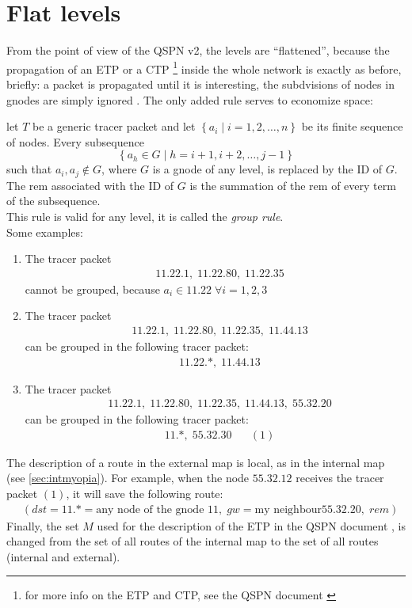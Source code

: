 \documentclass[a4paper]{article}
\newcommand{\T}[1]{\textrm{#1}}
\newcommand{\pgra}[1]{\left\{#1\right\}}
\newcommand{\eal}[1]{{\begin{align*} #1 \end{align*}}}
\def\'{{\;\;\;}}
\begin{document}
\section{Flat levels}
\label{sec:flat}
From the point of view of the QSPN v2, the levels are ``flattened'', because
the propagation of an ETP or a CTP \footnote{for more info on the ETP and CTP,
see the QSPN document \cite{qspndoc}} inside the whole network is exactly as
before, briefly: a packet is propagated until it is interesting, the
subdvisions of nodes in gnodes are simply ignored . The only
added rule serves to economize space: 

let $T$ be a generic tracer packet and let $\pgra{a_i\;|\;i=1,2,\dots,n}$ be its finite sequence of nodes.
Every subsequence \[\pgra{a_h\in G\;|\;h=i+1,i+2,\dots,j-1}\]
such that $a_i,a_j\notin G$, where $G$ is a gnode of any level, is replaced by
the ID of $G$. The rem associated with the ID of $G$ is the summation of the
rem of every term of the subsequence.\\
This rule is valid for any level, it is called the \emph{group rule}.\\
Some examples:
\begin{enumerate}
	\item The tracer packet
		\eal{&11.22.1,\;11.22.80,\;11.22.35}
		cannot be grouped, because $a_i\in 11.22\;\forall i =1,2,3$
	\item The tracer packet
		\eal{&11.22.1,\;11.22.80,\;11.22.35,\;11.44.13}
		can be grouped in the following tracer packet:
		\eal{&11.22.*,\;11.44.13}
	\item The tracer packet
		\eal{&11.22.1,\;11.22.80,\;11.22.35,\;11.44.13,\;55.32.20}
		can be grouped in the following tracer packet:
		\eal{&11.*,\;55.32.30\'\'(1)}
\end{enumerate}
The description of a route in the external map is local, as in the internal
map (see \ref{sec:intmyopia}). For example, when the node $55.32.12$ receives
the tracer packet $(1)$, it will save the following route:
\eal{&(dst=11.*=\T{any node of the gnode $11$},\;gw=\T{my neighbour
$55.32.20$},\;rem)
}
Finally, the set $M$ used for the description of the ETP in the QSPN document
\cite{qspndoc}, is changed from the set of all routes of the internal map to
the set of all routes (internal and external).\\
\end{document}

